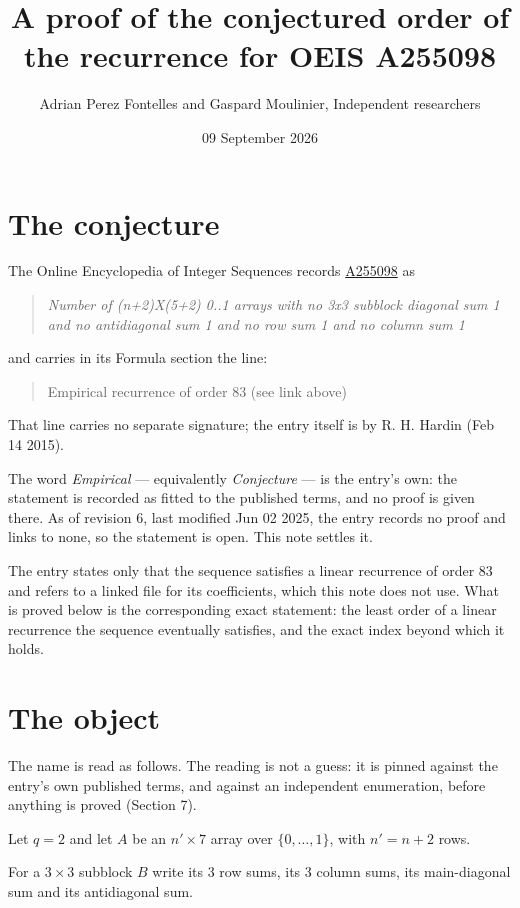 \documentclass[11pt]{article}
\title{A proof of the conjectured order of the recurrence for OEIS A255098}
\author{Adrian Perez Fontelles and Gaspard Moulinier, Independent researchers}
\date{09 September 2026}
\theoremstyle{definition}
\begin{document}
\maketitle
\section{The conjecture}

The Online Encyclopedia of Integer Sequences records \href{https://oeis.org/A255098}{A255098} as

\begin{quote}\itshape Number of (n+2)X(5+2) 0..1 arrays with no 3x3 subblock diagonal sum 1 and no antidiagonal sum 1 and no row sum 1 and no column sum 1\end{quote}

and carries in its Formula section the line:

\begin{quote}\ttfamily Empirical recurrence of order 83 (see link above)\end{quote}

That line carries no separate signature; the entry itself is by R. H. Hardin (Feb 14 2015).

The word {\itshape Empirical} --- equivalently {\itshape Conjecture} --- is the entry's own: the statement is recorded as fitted to the published terms, and no proof is given there. As of revision 6, last modified Jun 02 2025, the entry records no proof and links to none, so the statement is open. This note settles it.

The entry states only that the sequence satisfies a linear recurrence of order $83$ and refers to a linked file for its coefficients, which this note does not use. What is proved below is the corresponding exact statement: the least order of a linear recurrence the sequence eventually satisfies, and the exact index beyond which it holds.

\section{The object}

The name is read as follows. The reading is not a guess: it is pinned against the entry's own published terms, and against an independent enumeration, before anything is proved (Section 7).

Let $q = 2$ and let $A$ be an $n' \times 7$ array over $\{0,\dots,1\}$, with $n' = n + 2$ rows.

For a $3\times3$ subblock $B$ write its 3 row sums, its 3 column sums, its main-diagonal sum and its antidiagonal sum.
\end{document}
